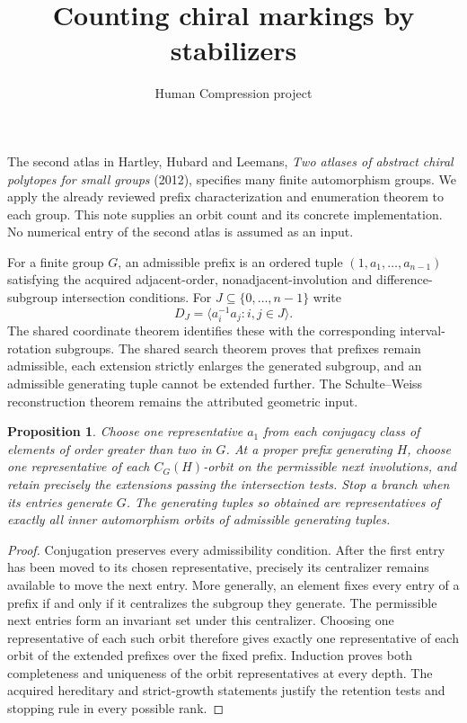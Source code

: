 \documentclass[11pt,a4paper]{article}
\title{Counting chiral markings by stabilizers}
\author{Human Compression project}\date{}
\newtheorem{proposition}{Proposition}
\begin{document}
\maketitle
The second atlas in Hartley, Hubard and Leemans,
\emph{Two atlases of abstract chiral polytopes for small groups}
(2012), specifies many finite automorphism groups. We apply the already
reviewed prefix characterization and enumeration theorem to each group.
This note supplies an orbit count and its concrete implementation.
No numerical entry of the second atlas is assumed as an input.

For a finite group $G$, an admissible prefix is an ordered tuple
$(1,a_1,\ldots,a_{n-1})$ satisfying the acquired adjacent-order,
nonadjacent-involution and difference-subgroup intersection conditions.
For $J\subseteq\{0,\ldots,n-1\}$ write
\[
D_J=\langle a_i^{-1}a_j:i,j\in J\rangle.
\]
The shared coordinate theorem identifies these with the corresponding
interval-rotation subgroups. The shared search theorem proves that
prefixes remain admissible, each extension strictly enlarges the
generated subgroup, and an admissible generating tuple cannot be
extended further. The Schulte--Weiss reconstruction theorem remains
the attributed geometric input.

\begin{proposition}
Choose one representative $a_1$ from each conjugacy class of elements
of order greater than two in $G$. At a proper prefix generating $H$,
choose one representative of each $C_G(H)$-orbit on the permissible
next involutions, and retain precisely the extensions passing the
intersection tests. Stop a branch when its entries generate $G$.
The generating tuples so obtained are representatives of exactly all
inner automorphism orbits of admissible generating tuples.
\end{proposition}
\begin{proof}
Conjugation preserves every admissibility condition. After the first
entry has been moved to its chosen representative, precisely its
centralizer remains available to move the next entry. More generally,
an element fixes every entry of a prefix if and only if it centralizes
the subgroup they generate. The permissible next entries form an
invariant set under this centralizer. Choosing one representative of
each such orbit therefore gives exactly one representative of each
orbit of the extended prefixes over the fixed prefix. Induction proves
both completeness and uniqueness of the orbit representatives at every
depth. The acquired hereditary and strict-growth statements justify
the retention tests and stopping rule in every possible rank.
\end{proof}
\end{document}
